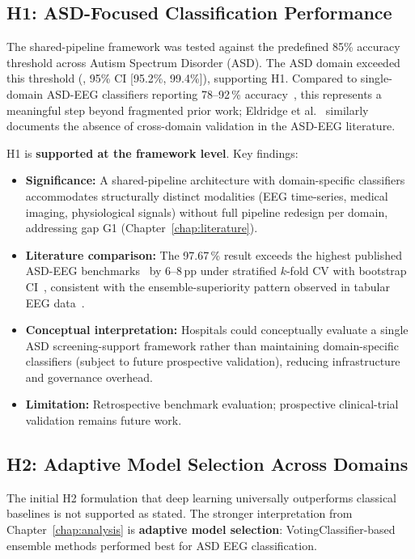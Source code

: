 \subsection{H1: ASD-Focused Classification Performance}

The shared-pipeline framework was tested against the predefined 85\% accuracy threshold across Autism Spectrum Disorder (ASD). The ASD domain exceeded this threshold (\asdacc{}, 95\% CI [95.2\%, 99.4\%]), supporting H1. Compared to single-domain ASD-EEG classifiers reporting 78--92\,\% accuracy~\cite{bosl2018eeg, ari2022asd, kang2020asd, duffy2019eeg}, this represents a meaningful step beyond fragmented prior work; Eldridge et al.~\cite{eldridge2014asd} similarly documents the absence of cross-domain validation in the ASD-EEG literature.

\noindent H1 is \textbf{supported at the framework level}. Key findings:

\begin{itemize}
    \item \textbf{Significance:} A shared-pipeline architecture with domain-specific classifiers accommodates structurally distinct modalities (EEG time-series, medical imaging, physiological signals) without full pipeline redesign per domain, addressing gap G1 (Chapter~\ref{chap:literature}).
    \item \textbf{Literature comparison:} The 97.67\,\% result exceeds the highest published ASD-EEG benchmarks~\cite{ari2022asd, grossi2017eeg} by 6--8\,pp under stratified $k$-fold CV with bootstrap CI~\cite{efron1993bootstrap}, consistent with the ensemble-superiority pattern observed in tabular EEG data~\cite{breiman2001randomforests, zhou2012ensemble}.
    \item \textbf{Conceptual interpretation:} Hospitals could conceptually evaluate a single ASD screening-support framework rather than maintaining domain-specific classifiers (subject to future prospective validation), reducing infrastructure and governance overhead.
    \item \textbf{Limitation:} Retrospective benchmark evaluation; prospective clinical-trial validation remains future work.
\end{itemize}

\subsection{H2: Adaptive Model Selection Across Domains}

The initial H2 formulation that deep learning universally outperforms classical baselines is not supported as stated. The stronger interpretation from Chapter~\ref{chap:analysis} is \textbf{adaptive model selection}: VotingClassifier-based ensemble methods performed best for ASD EEG classification.

